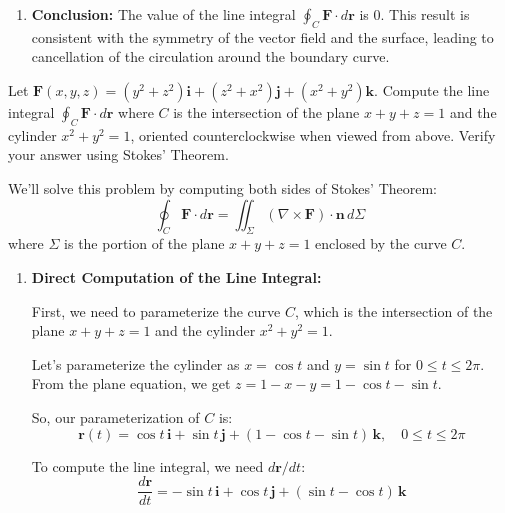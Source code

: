 \begin{example}
\begin{solution}
\begin{enumerate}
    Therefore, each term in the integrand integrates to zero over the interval $0$ to $2\pi$:
    \[
    \oint_C \mathbf{F} \cdot d\mathbf{r} = 0
    \]
    
    \item \textbf{Conclusion:} The value of the line integral $\oint_C \mathbf{F} \cdot d\mathbf{r}$ is $0$. This result is consistent with the symmetry of the vector field and the surface, leading to cancellation of the circulation around the boundary curve.
\end{enumerate}

\end{solution}
\end{example}
\exampleline
\begin{example}
Let $\mathbf{F}(x,y,z) = (y^2 + z^2)\mathbf{i} + (z^2 + x^2)\mathbf{j} + (x^2 + y^2)\mathbf{k}$. Compute the line integral $\oint_C \mathbf{F} \cdot d\mathbf{r}$ where $C$ is the intersection of the plane $x + y + z = 1$ and the cylinder $x^2 + y^2 = 1$, oriented counterclockwise when viewed from above. Verify your answer using Stokes' Theorem.

\begin{solution}
We'll solve this problem by computing both sides of Stokes' Theorem:
\[
\oint_C \mathbf{F} \cdot d\mathbf{r} = \iint_\Sigma (\nabla \times \mathbf{F}) \cdot \mathbf{n}\,d\Sigma
\]
where $\Sigma$ is the portion of the plane $x + y + z = 1$ enclosed by the curve $C$.

\begin{enumerate}
    \item \textbf{Direct Computation of the Line Integral:}
    
    First, we need to parameterize the curve $C$, which is the intersection of the plane $x + y + z = 1$ and the cylinder $x^2 + y^2 = 1$.
    
    Let's parameterize the cylinder as $x = \cos t$ and $y = \sin t$ for $0 \leq t \leq 2\pi$. 
    From the plane equation, we get $z = 1 - x - y = 1 - \cos t - \sin t$.
    
    So, our parameterization of $C$ is:
    \[
    \mathbf{r}(t) = \cos t\,\mathbf{i} + \sin t\,\mathbf{j} + (1 - \cos t - \sin t)\,\mathbf{k}, \quad 0 \leq t \leq 2\pi
    \]
    
    To compute the line integral, we need $d\mathbf{r}/dt$:
    \[
    \frac{d\mathbf{r}}{dt} = -\sin t\,\mathbf{i} + \cos t\,\mathbf{j} + (\sin t - \cos t)\,\mathbf{k}
    \]
    

\end{enumerate}
\end{solution}
\end{example}
